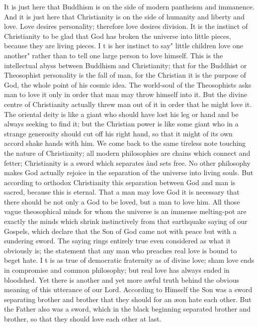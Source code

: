 \documentclass{book}
\begin{document}
It is just here that Buddhism is on the side of modern pantheism and immanence. And it is just here that Christianity is on the side of humanity and liberty and love. Love desires personality; therefore love desires division. It is the instinct of Christianity to be glad that God has broken the universe into little pieces, because they are living pieces. I t is her instinct to say" little children love one another" rather than to tell one large person to love himself. This is the intellectual abyss between Buddhism and Christianity; that for the Buddhist or Theosophist personality is the fall of man, for the Christian it is the purpose of God, the whole point of his cosmic idea. The world-soul of the Theosophists asks man to love it only in order that man may throw himself into it. But the divine centre of Christianity actually threw man out of it in order that he might love it. The oriental deity is like a giant who should have lost his leg or hand and be always seeking to find it; but the Christian power is like some giant who in a strange generosity should cut off his right hand, so that it might of its own accord shake hands with him. We come back to the same tireless note touching the nature of Christianity; all modern philosophies are chains which connect and fetter; Christianity is a sword which separates ànd sets free. No other philosophy makes God actually rejoice in the separation of the universe into living souls. But according to orthodox Christianity this separation between God and man is sacred, because this is eternal. That a man may love God it is necessary that there should be not only a God to be loved, but a man to love him. All those vague theosophical minds for whom the universe is an immense melting-pot are exactly the minds which shrink instinctively from that earthquake saying of our Gospels, which declare that the Son of God came not with peace but with a sundering sword. The saying rings entirely true even considered as what it obviously is; the statement that any man who preaches real love is bound to beget hate. I t is as true of democratic fraternity as of divine love; sham love ends in compromise and common philosophy; but real love has always ended in bloodshed. Yet there is another and yet more awful truth behind the obvious meaning of this utterance of our Lord. According to Himself the Son was a sword separating brother and brother that they should for an æon hate each other. But the Father also was a sword, which in the black beginning separated brother and brother, so that they should love each other at last.
\end{document}
